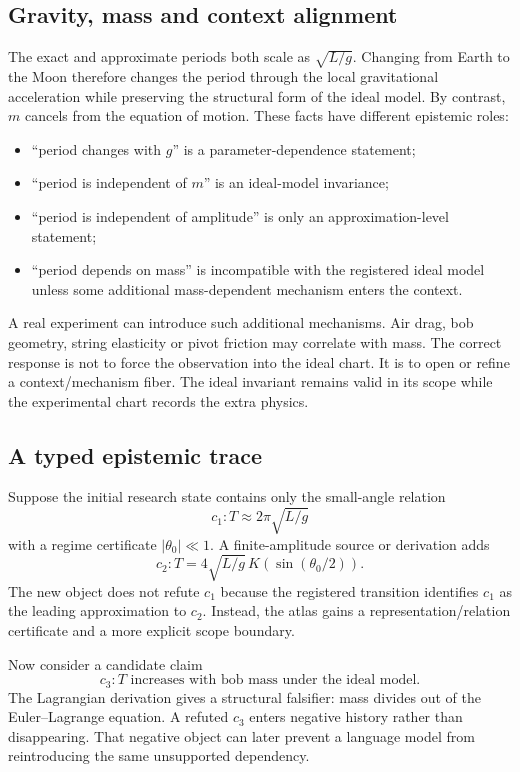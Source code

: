 \subsection{Gravity, mass and context alignment}

The exact and approximate periods both scale as \(\sqrt{L/g}\). Changing from Earth to the Moon therefore changes the period through the local gravitational acceleration while preserving the structural form of the ideal model. By contrast, \(m\) cancels from the equation of motion. These facts have different epistemic roles:

\begin{itemize}[leftmargin=*]
\item ``period changes with \(g\)'' is a parameter-dependence statement;
\item ``period is independent of \(m\)'' is an ideal-model invariance;
\item ``period is independent of amplitude'' is only an approximation-level statement;
\item ``period depends on mass'' is incompatible with the registered ideal model unless some additional mass-dependent mechanism enters the context.
\end{itemize}

A real experiment can introduce such additional mechanisms. Air drag, bob geometry, string elasticity or pivot friction may correlate with mass. The correct response is not to force the observation into the ideal chart. It is to open or refine a context/mechanism fiber. The ideal invariant remains valid in its scope while the experimental chart records the extra physics.

\subsection{A typed epistemic trace}

Suppose the initial research state contains only the small-angle relation
\[
c_1:T\approx2\pi\sqrt{L/g}
\]
with a regime certificate \(|\theta_0|\ll1\). A finite-amplitude source or derivation adds
\[
c_2:T=4\sqrt{L/g}\,K(\sin(\theta_0/2)).
\]
The new object does not refute \(c_1\) because the registered transition identifies \(c_1\) as the leading approximation to \(c_2\). Instead, the atlas gains a representation/relation certificate and a more explicit scope boundary.

Now consider a candidate claim
\[
c_3:T\text{ increases with bob mass under the ideal model}.
\]
The Lagrangian derivation gives a structural falsifier: mass divides out of the Euler--Lagrange equation. A refuted \(c_3\) enters negative history rather than disappearing. That negative object can later prevent a language model from reintroducing the same unsupported dependency.

